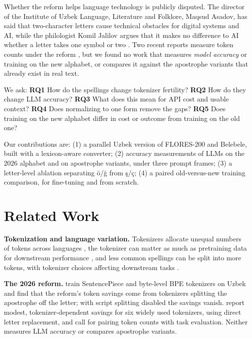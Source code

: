 Whether the reform helps language technology is publicly disputed. The director of the Institute of Uzbek Language, Literature and Folklore, Maqsud Asadov, has said that two-character letters cause technical obstacles for digital systems and AI, while the philologist Komil Jalilov argues that it makes no difference to AI whether a letter takes one symbol or two \citep{sobirov2026}. Two recent reports measure token counts under the reform \citep{rozimatov2026, ibadullaev2026}, but we found no work that measures \emph{model accuracy} or training on the new alphabet, or compares it against the apostrophe variants that already exist in real text.

We ask:
\textbf{RQ1} How do the spellings change tokenizer fertility?
\textbf{RQ2} How do they change LLM accuracy?
\textbf{RQ3} What does this mean for API cost and usable context?
\textbf{RQ4} Does normalizing to one form remove the gaps?
\textbf{RQ5} Does training on the new alphabet differ in cost or outcome from training on the old one?

Our contributions are: (1) a parallel Uzbek version of FLORES-200 and Belebele, built with a lexicon-aware converter; (2) accuracy measurements of LLMs on the 2026 alphabet and on apostrophe variants, under three prompt frames; (3) a letter-level ablation separating \"o/\u{g} from \c{s}/\c{c}; (4) a paired old-versus-new training comparison, for fine-tuning and from scratch.

\section{Related Work}
\textbf{Tokenization and language variation.} Tokenizers allocate unequal numbers of tokens across languages \citep{petrov2023}, the tokenizer can matter as much as pretraining data for downstream performance \citep{rust2021}, and less common spellings can be split into more tokens, with tokenizer choices affecting downstream tasks \citep{wegmann2025}.

\textbf{The 2026 reform.} \citet{ibadullaev2026} train SentencePiece and byte-level BPE tokenizers on Uzbek and find that the reform's token savings come from tokenizers splitting the apostrophe off the letter; with script splitting disabled the savings vanish. \citet{rozimatov2026} report modest, tokenizer-dependent savings for six widely used tokenizers, using direct letter replacement, and call for pairing token counts with task evaluation. Neither measures LLM accuracy or compares apostrophe variants.

